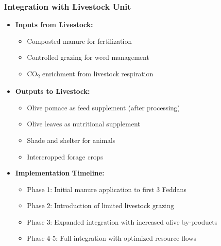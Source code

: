 \subsubsection{Integration with Livestock Unit}
\begin{itemize}
    \item \textbf{Inputs from Livestock:}
    \begin{itemize}
        \item Composted manure for fertilization
        \item Controlled grazing for weed management
        \item CO\textsubscript{2} enrichment from livestock respiration
    \end{itemize}
    
    \item \textbf{Outputs to Livestock:}
    \begin{itemize}
        \item Olive pomace as feed supplement (after processing)
        \item Olive leaves as nutritional supplement
        \item Shade and shelter for animals
        \item Intercropped forage crops
    \end{itemize}
    
    \item \textbf{Implementation Timeline:}
    \begin{itemize}
        \item Phase 1: Initial manure application to first 3 Feddans
        \item Phase 2: Introduction of limited livestock grazing
        \item Phase 3: Expanded integration with increased olive by-products
        \item Phase 4-5: Full integration with optimized resource flows
    \end{itemize}
\end{itemize}


